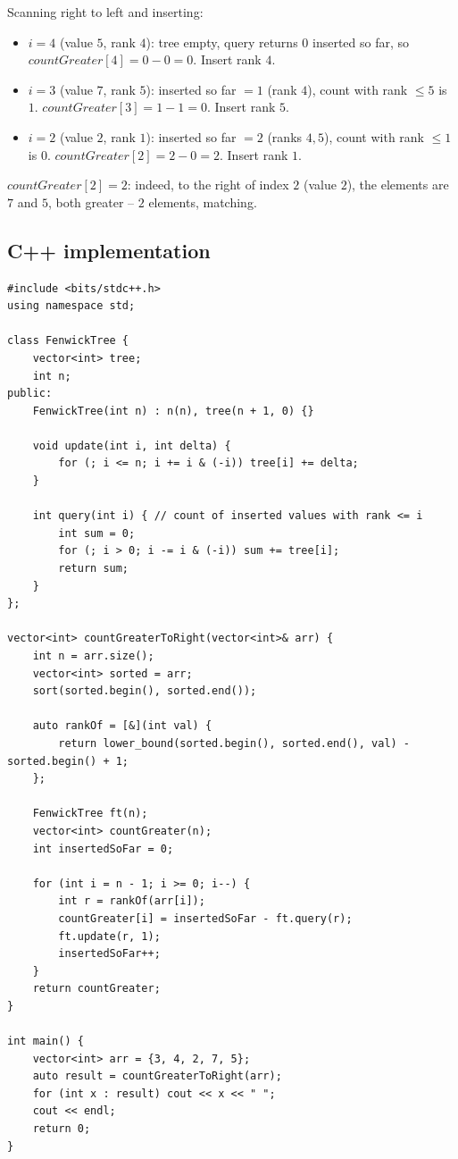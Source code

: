 Scanning right to left and inserting:

\begin{itemize}
  \item $i=4$ (value $5$, rank $4$): tree empty, query returns $0$
        inserted so far, so $\textit{countGreater}[4]=0-0=0$. Insert
        rank $4$.
  \item $i=3$ (value $7$, rank $5$): inserted so far $=1$ (rank $4$),
        count with rank $\le5$ is $1$. $\textit{countGreater}[3]=1-1=0$.
        Insert rank $5$.
  \item $i=2$ (value $2$, rank $1$): inserted so far $=2$ (ranks
        $4,5$), count with rank $\le1$ is $0$.
        $\textit{countGreater}[2]=2-0=2$. Insert rank $1$.
\end{itemize}

$\textit{countGreater}[2]=2$: indeed, to the right of index $2$ (value
$2$), the elements are $7$ and $5$, both greater -- $2$ elements,
matching.

\subsection*{C++ implementation}

\begin{lstlisting}
#include <bits/stdc++.h>
using namespace std;

class FenwickTree {
    vector<int> tree;
    int n;
public:
    FenwickTree(int n) : n(n), tree(n + 1, 0) {}

    void update(int i, int delta) {
        for (; i <= n; i += i & (-i)) tree[i] += delta;
    }

    int query(int i) { // count of inserted values with rank <= i
        int sum = 0;
        for (; i > 0; i -= i & (-i)) sum += tree[i];
        return sum;
    }
};

vector<int> countGreaterToRight(vector<int>& arr) {
    int n = arr.size();
    vector<int> sorted = arr;
    sort(sorted.begin(), sorted.end());

    auto rankOf = [&](int val) {
        return lower_bound(sorted.begin(), sorted.end(), val) - sorted.begin() + 1;
    };

    FenwickTree ft(n);
    vector<int> countGreater(n);
    int insertedSoFar = 0;

    for (int i = n - 1; i >= 0; i--) {
        int r = rankOf(arr[i]);
        countGreater[i] = insertedSoFar - ft.query(r);
        ft.update(r, 1);
        insertedSoFar++;
    }
    return countGreater;
}

int main() {
    vector<int> arr = {3, 4, 2, 7, 5};
    auto result = countGreaterToRight(arr);
    for (int x : result) cout << x << " ";
    cout << endl;
    return 0;
}
\end{lstlisting}

